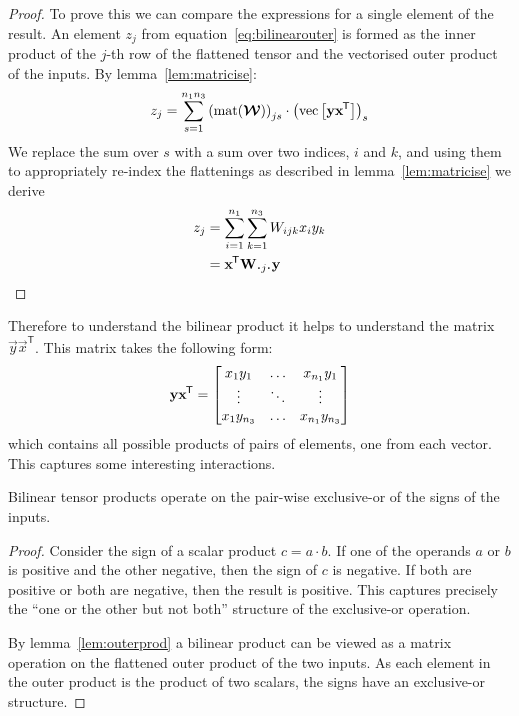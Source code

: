 \begin{proof}
To
prove this we can compare the expressions for a single element of the result.
An element \(z_j\) from equation~\eqref{eq:bilinearouter}
is formed as the inner product of the \(j\)-th
row of the flattened tensor and the vectorised outer product of the inputs. By 
lemma~\ref{lem:matricise}:
\begin{equation}
	z_j = 
	\sum_{s=1}^{n_1n_3} \left(\operatorname{mat}(\bm{\mathcal{W}})\right)_{js} \cdot
	\left( \operatorname{vec}\left[\mathbf{y}\mathbf{x}^{\mkern-1.5mu\mathsf{T}}\right]\right)_s
\end{equation}
We replace the sum over \(s\) with a sum over two
indices, \(i\) and \(k\), and using them to appropriately re-index the flattenings 
as described in lemma~\ref{lem:matricise} we 
derive
\begin{align}
	z_j &= \sum_{i=1}^{n_1}\sum_{k=1}^{n_3} W_{ijk} x_i y_k \\
		&= \tran{\vec{x}}\mat{W}_{\midbullet j \midbullet}\vec{y}
\end{align}

\end{proof}


Therefore to understand the bilinear product it helps to understand the matrix 
\(\vec{y}\vec{x}^\mathsf{T}\). This matrix takes the following form:
\begin{equation}\label{eq:outer}
	\mathbf{y}\mathbf{x}^{\mkern-1.5mu\mathsf{T}} = \begin{bmatrix}
		x_1y_1 & \ldots & x_{n_1}y_1 \\
		\vdots & \ddots & \vdots \\
		x_1y_{n_3} & \ldots & x_{n_1}y_{n_3}
	\end{bmatrix}
\end{equation} which contains all possible products of pairs of elements, one from each vector. 
This captures some interesting interactions.

\begin{thm}  \label{thm:xor}
Bilinear tensor products operate on the pair-wise exclusive-or of the
signs of the inputs.
\end{thm}
\begin{proof}
Consider the sign of a scalar product
\(c = a\cdot b\). If one of the operands \(a\) or \(b\) is positive and the other negative,
then the sign of \(c\) is negative. If both are positive or both are negative, then the
result is positive. This captures precisely the ``one or the other but not both'' structure
of the exclusive-or operation.

By lemma~\ref{lem:outerprod} a bilinear product can be viewed as a matrix operation on the flattened
outer product of the two inputs. As each element in the outer product is the product of two scalars,
the signs have an exclusive-or structure.
\end{proof}

